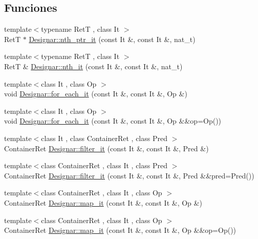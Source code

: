 \subsection*{Funciones}
\begin{DoxyCompactItemize}
\item 
{\footnotesize template$<$typename RetT , class It $>$ }\\RetT $\ast$ \hyperlink{namespace_designar_a72ca73ad8bb829f0ea703a0bfa62414c}{Designar\+::nth\+\_\+ptr\+\_\+it} (const It \&, const It \&, nat\+\_\+t)
\item 
{\footnotesize template$<$typename RetT , class It $>$ }\\RetT \& \hyperlink{namespace_designar_a6009b5708fa05c048e3d11a5893165d1}{Designar\+::nth\+\_\+it} (const It \&, const It \&, nat\+\_\+t)
\item 
{\footnotesize template$<$class It , class Op $>$ }\\void \hyperlink{namespace_designar_a4e4d2731163735de1b313fbd6e888336}{Designar\+::for\+\_\+each\+\_\+it} (const It \&, const It \&, Op \&)
\item 
{\footnotesize template$<$class It , class Op $>$ }\\void \hyperlink{namespace_designar_a773f2843935a2d490b202240480d9e86}{Designar\+::for\+\_\+each\+\_\+it} (const It \&, const It \&, Op \&\&op=Op())
\item 
{\footnotesize template$<$class It , class Container\+Ret , class Pred $>$ }\\Container\+Ret \hyperlink{namespace_designar_a2e9a7f0c3737ea50acaaa849e78792ac}{Designar\+::filter\+\_\+it} (const It \&, const It \&, Pred \&)
\item 
{\footnotesize template$<$class Container\+Ret , class It , class Pred $>$ }\\Container\+Ret \hyperlink{namespace_designar_a0eadd36ecf06d087630130873fdc6a49}{Designar\+::filter\+\_\+it} (const It \&, const It \&, Pred \&\&pred=Pred())
\item 
{\footnotesize template$<$class Container\+Ret , class It , class Op $>$ }\\Container\+Ret \hyperlink{namespace_designar_afc87b7b7fbcaed27883b20975ff10e3a}{Designar\+::map\+\_\+it} (const It \&, const It \&, Op \&)
\item 
{\footnotesize template$<$class Container\+Ret , class It , class Op $>$ }\\Container\+Ret \hyperlink{namespace_designar_af22321d9c71f1bfa82df1e71f779dc86}{Designar\+::map\+\_\+it} (const It \&, const It \&, Op \&\&op=Op())

\end{DoxyCompactItemize}
